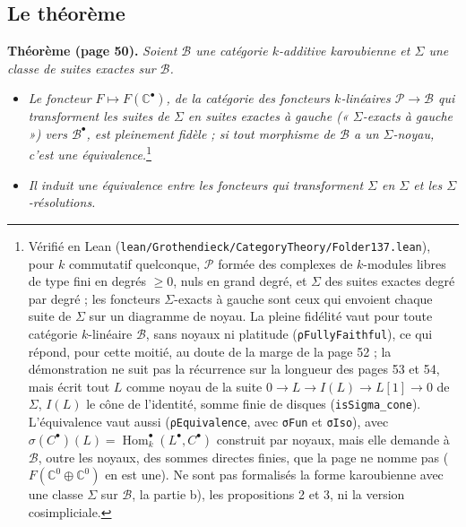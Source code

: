 \documentclass[11pt,a4paper]{article}
\begin{document}
\subsection*{Le théorème}

\textbf{Théorème (page 50).} \emph{Soient $\mathcal{B}$ une catégorie
$k$-additive karoubienne et $\Sigma$ une classe de suites exactes sur
$\mathcal{B}$.}
\begin{itemize}
\item[a)] \emph{Le foncteur $F \mapsto F(\mathbb{C}^{\bullet})$, de la
catégorie des foncteurs $k$-linéaires $\mathcal{P} \to \mathcal{B}$ qui
transforment les suites de $\Sigma$ en suites exactes à gauche (« $\Sigma$-exacts à gauche ») vers $\mathcal{B}^{\bullet}$, est pleinement fidèle ;
si tout morphisme de $\mathcal{B}$ a un $\Sigma$-noyau, c'est une
équivalence.}\footnote{Vérifié en Lean (\texttt{lean/Grothendieck/CategoryTheory/Folder137.lean}),
pour $k$ commutatif quelconque, $\mathcal{P}$ formée des complexes de $k$-modules
libres de type fini en degrés $\geqslant 0$, nuls en grand degré, et $\Sigma$ des
suites exactes degré par degré ; les foncteurs $\Sigma$-exacts à gauche sont ceux
qui envoient chaque suite de $\Sigma$ sur un diagramme de noyau. La pleine
fidélité vaut pour toute catégorie $k$-linéaire $\mathcal{B}$, sans noyaux ni
platitude (\texttt{ρFullyFaithful}), ce qui répond, pour cette moitié, au doute
de la marge de la page 52 ; la démonstration ne suit pas la récurrence sur la
longueur des pages 53 et 54, mais écrit tout $L$ comme noyau de la suite
$0 \to L \to I(L) \to L[1] \to 0$ de $\Sigma$, $I(L)$ le cône de l'identité,
somme finie de disques (\texttt{isSigma\_cone}). L'équivalence vaut aussi
(\texttt{ρEquivalence}, avec \texttt{σFun} et \texttt{σIso}), avec
$\sigma(C^{\bullet})(L) = \operatorname{Hom}^{\bullet}_{k}(L^{\bullet},
C^{\bullet})$ construit par noyaux, mais elle demande à $\mathcal{B}$, outre les
noyaux, des sommes directes finies, que la page ne nomme pas
($F(\mathbb{C}^{0} \oplus \mathbb{C}^{0})$ en est une). Ne sont pas formalisés
la forme karoubienne avec une classe $\Sigma$ sur $\mathcal{B}$, la partie b),
les propositions 2 et 3, ni la version cosimpliciale.}
\item[b)] \emph{Il induit une équivalence entre les foncteurs qui
transforment $\Sigma$ en $\Sigma$ et les $\Sigma$-résolutions.}
\end{itemize}
\end{document}
